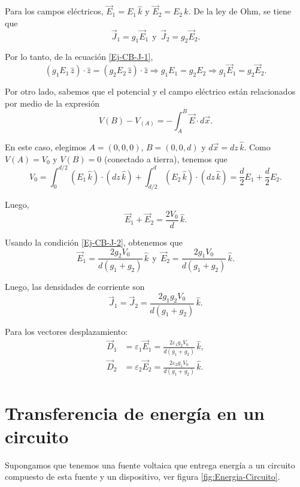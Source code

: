\begin{ejemplo}
    Para los campos eléctricos, $\Vec{E}_1 = E_1 \,\hat{k}$ y $\Vec{E}_2 = E_2 \,\hat{k}$. De la ley de Ohm, se tiene que
    $$\Vec{J}_1 = g_1 \Vec{E}_1 ~~\text{y}~~ \Vec{J}_2 = g_2 \Vec{E}_2.$$

    Por lo tanto, de la ecuación \eqref{Ej-CB-J-1},
    \begin{equation}
        (g_1 E_1 \,\hat{z}) \cdot \hat{z} =  (g_2 E_2 \,\hat{z}) \cdot \hat{z} \Rightarrow g_1 E_1 = g_2E_2 \Rightarrow g_1 \vec{E}_1 = g_2 \Vec{E}_2. \label{Ej-CB-J-2}
    \end{equation}

    Por otro lado, sabemos que el potencial y  el campo eléctrico están relacionados por medio de la expresión
    $$V(B) - V_(A) = - \int_A^B \Vec{E} \cdot d\Vec{x}.$$

    En este caso, elegimos $A = (0,0,0)$, $B = (0,0,d)$ y $d\Vec{x} = dz\,\hat{k}$. Como $V(A) = V_0$ y $V(B) = 0$ (conectado a tierra), tenemos que
    $$V_0 = \int_0^{d/2} (E_1 \,\hat{k}) \cdot (dz \,\hat{k}) + \int_{d/2}^d (E_2 \,\hat{k}) \cdot (dz \,\hat{k}) =  \frac{d}{2} E_1 + \frac{d}{2} E_2.$$

   Luego,
   $$\Vec{E}_1 + \Vec{E}_2 = \frac{2V_0}{d} \,\hat{k}.$$

   Usando la condición \eqref{Ej-CB-J-2}, obtenemos que
   $$\vec{E}_1 = \frac{2g_2 V_0}{d(g_1 + g_2)} \,\hat{k} ~~\text{y}~~ \vec{E}_2 = \frac{2g_1 V_0}{d(g_1 + g_2)} \,\hat{k}.$$

   Luego, las densidades de corriente son
   $$\Vec{J}_1 = \Vec{J}_2 = \frac{2g_1 g_2 V_0}{d(g_1 + g_2)} \,\hat{k}.$$

   Para los vectores desplazamiento:
   \begin{align*}
       \Vec{D}_1 &= \varepsilon_1 \Vec{E}_1 = \frac{2 \varepsilon_1 g_2 V_0}{d(g_1 + g_2)} \,\hat{k} ,\\
       \Vec{D}_2 &= \varepsilon_2 \Vec{E}_2 = \frac{2 \varepsilon_2 g_1 V_0}{d(g_1 + g_2)} \,\hat{k}.
   \end{align*}
\end{ejemplo}

\section{Transferencia de energía en un circuito}

Supongamos que tenemos una fuente voltaica que entrega energía a un circuito compuesto de esta fuente y un dispositivo, ver figura \ref{fig:Energia-Circuito}.

